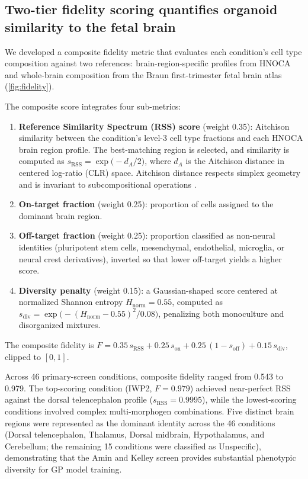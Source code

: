 \documentclass[times,twoside]{zHenriquesLab-StyleBioRxiv}
\newcommand{\hnoca}{\textsc{HNOCA}}
\begin{document}
\subsection*{Two-tier fidelity scoring quantifies organoid similarity to the fetal brain}

We developed a composite fidelity metric that evaluates each condition's cell type composition against two references: brain-region-specific profiles from \hnoca{} and whole-brain composition from the Braun first-trimester fetal brain atlas \cite{Braun2023} (\cref{fig:fidelity}).

The composite score integrates four sub-metrics:

\begin{enumerate}[nosep,leftmargin=*]
  \item \textbf{Reference Similarity Spectrum (RSS) score} (weight 0.35): Aitchison similarity between the condition's level-3 cell type fractions and each \hnoca{} brain region profile. The best-matching region is selected, and similarity is computed as $s_\text{RSS} = \exp\!\bigl(-d_A / 2\bigr)$, where $d_A$ is the Aitchison distance in centered log-ratio (CLR) space. Aitchison distance respects simplex geometry and is invariant to subcompositional operations \cite{Aitchison1986}.
  \item \textbf{On-target fraction} (weight 0.25): proportion of cells assigned to the dominant brain region.
  \item \textbf{Off-target fraction} (weight 0.25): proportion classified as non-neural identities (pluripotent stem cells, mesenchymal, endothelial, microglia, or neural crest derivatives), inverted so that lower off-target yields a higher score.
  \item \textbf{Diversity penalty} (weight 0.15): a Gaussian-shaped score centered at normalized Shannon entropy $H_\text{norm} = 0.55$, computed as $s_\text{div} = \exp\!\bigl(-({H_\text{norm} - 0.55})^2 / {0.08}\bigr)$, penalizing both monoculture and disorganized mixtures.
\end{enumerate}

The composite fidelity is $F = 0.35\, s_\text{RSS} + 0.25\, s_\text{on} + 0.25\,(1 - s_\text{off}) + 0.15\, s_\text{div}$, clipped to $[0,1]$.

Across 46 primary-screen conditions, composite fidelity ranged from 0.543 to 0.979. The top-scoring condition (IWP2, $F{=}0.979$) achieved near-perfect RSS against the dorsal telencephalon profile ($s_\text{RSS}{=}0.9995$), while the lowest-scoring conditions involved complex multi-morphogen combinations. Five distinct brain regions were represented as the dominant identity across the 46 conditions (Dorsal telencephalon, Thalamus, Dorsal midbrain, Hypothalamus, and Cerebellum; the remaining 15 conditions were classified as Unspecific), demonstrating that the Amin and Kelley screen provides substantial phenotypic diversity for GP model training.
\end{document}
